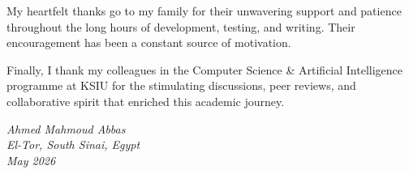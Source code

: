 \begin{singlespace}
My heartfelt thanks go to my family for their unwavering support and patience throughout the long hours of development, testing, and writing. Their encouragement has been a constant source of motivation.

Finally, I thank my colleagues in the Computer Science \& Artificial Intelligence programme at KSIU for the stimulating discussions, peer reviews, and collaborative spirit that enriched this academic journey.

\vspace{0.8cm}
\begin{flushright}
  \textit{Ahmed Mahmoud Abbas}\\
  \textit{El-Tor, South Sinai, Egypt}\\
  \textit{May 2026}
\end{flushright}
\end{singlespace}

\clearpage

